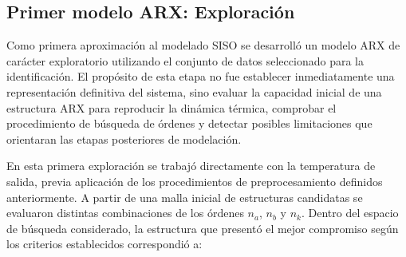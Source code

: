\documentclass[11pt]{report}
\begin{document}

\subsection{Primer modelo ARX: Exploración}

Como primera aproximación al modelado SISO se desarrolló un modelo ARX de carácter exploratorio utilizando el conjunto de datos seleccionado para la identificación. El propósito de esta etapa no fue establecer inmediatamente una representación definitiva del sistema, sino evaluar la capacidad inicial de una estructura ARX para reproducir la dinámica térmica, comprobar el procedimiento de búsqueda de órdenes y detectar posibles limitaciones que orientaran las etapas posteriores de modelación.

En esta primera exploración se trabajó directamente con la temperatura de salida, previa aplicación de los procedimientos de preprocesamiento definidos anteriormente. A partir de una malla inicial de estructuras candidatas se evaluaron distintas combinaciones de los órdenes $n_{a}$, $n_{b}$ y $n_{k}$. Dentro del espacio de búsqueda considerado, la estructura que presentó el mejor compromiso según los criterios establecidos correspondió a:
\end{document}
